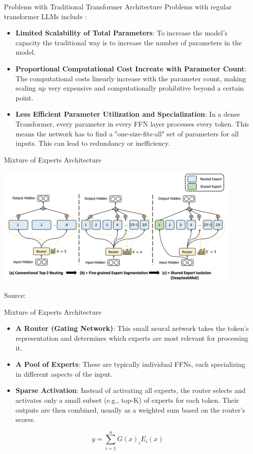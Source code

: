 \documentclass{beamer}
\begin{document}
\begin{frame}{Problems with Traditional Transformer Architecture}
  Problems with regular transformer LLMs include \cite{shazeer2017outrageously} \cite{dai2024deepseekmoe}:
  \begin{itemize}
    \item \textbf{Limited Scalability of Total Parameters}: To increase the model's capacity the
    traditional way is to increase the number of parameters in the model.
    \item \textbf{Proportional Computational Cost Increate with Parameter Count}: The computational costs
    linearly increase with the parameter count, making scaling up very expensive and computationally prohibitive beyond a certain point.
    \item \textbf{Less Efficient Parameter Utilization and Specialization}: In a dense Transformer, every parameter in every FFN layer processes every token. 
    This means the network has to find a "one-size-fits-all" set of parameters for all inputs. This can lead to redundancy or inefficiency.
  \end{itemize}
\end{frame}

\begin{frame}{Mixture of Experts Architecture}
  \begin{center}
        \includegraphics[width=0.9\textwidth]{Moe.png}
        \par
        \small Source:  \cite{dai2024deepseekmoe}
    \end{center}
\end{frame}

\begin{frame}{Mixture of Experts Architecture}
  \begin{itemize}
        \item \textbf{A Router (Gating Network)}: This small neural network takes the token's representation and determines which experts are most relevant for processing it.
        \item \textbf{A Pool of Experts}: These are typically individual FFNs, each specializing in different aspects of the input.
        \item \textbf{Sparse Activation}: Instead of activating all experts, the router selects and activates only a small subset (e.g., top-K) of experts for each token. Their outputs are then combined, usually as a weighted sum based on the router's scores.
    \end{itemize}
    \cite{shazeer2017outrageously}

    $$ y = \sum_{i=1}^{n} G(x)_i E_i(x) $$
\end{frame}
\end{document}
